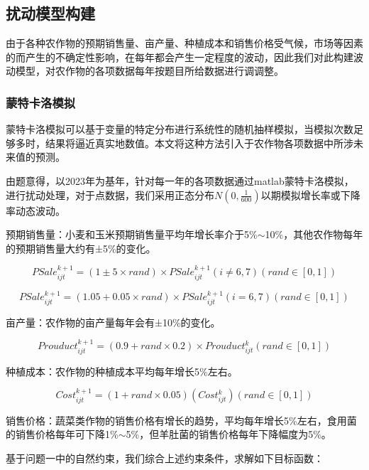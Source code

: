 \documentclass[withoutpreface,bwprint]{cumcmthesis} %
\begin{document}
\subsection{扰动模型构建}

由于各种农作物的预期销售量、亩产量、种植成本和销售价格受气候，市场等因素的而产生的不确定性影响，在每年都会产生一定程度的波动，因此我们对此构建波动模型，对农作物的各项数据每年按题目所给数据进行调调整。

\subsubsection{蒙特卡洛模拟}

蒙特卡洛模拟可以基于变量的特定分布进行系统性的随机抽样模拟，当模拟次数足够多时，结果将逼近真实地数值。本文将这种方法引入于农作物各项数据中所涉未来值的预测。

由题意得，以2023年为基年，针对每一年的各项数据通过matlab蒙特卡洛模拟，进行扰动处理，对于点数据，我们采用正态分布$N(0,\frac{1}{600})$以期模拟增长率或下降率动态波动。

预期销售量：小麦和玉米预期销售量平均年增长率介于5\%$\sim$10\%，其他农作物每年的预期销售量大约有±5\%的变化。

\begin{equation}
	PSale^{k+1}_{ijt}=(1\pm5\times rand)\times PSale^{k+1}_{ijt}(i\ne 6,7)(rand\in[0,1])
\end{equation}

\begin{equation}
	PSale^{k+1}_{ijt}=(1.05+0.05\times rand)\times PSale^{k+1}_{ijt}(i= 6,7)(rand\in[0,1])
\end{equation}

亩产量：农作物的亩产量每年会有±10\%的变化。

\begin{equation}
	Prouduct^{k+1}_{ijt}=(0.9+rand\times 0.2)\times Prouduct^{k}_{ijt}(rand\in[0,1])
\end{equation}
 
种植成本：农作物的种植成本平均每年增长5\%左右。

\begin{equation}
	Cost^{k+1}_{ijt}=	(1+rand\times 0.05)(Cost^{k}_{ijt})(rand\in[0,1])
\end{equation}

销售价格：蔬菜类作物的销售价格有增长的趋势，平均每年增长5\%左右，食用菌的销售价格每年可下降1\%$\sim$5\%，但羊肚菌的销售价格每年下降幅度为5\%。

基于问题一中的自然约束，我们综合上述约束条件，求解如下目标函数：
\end{document}
